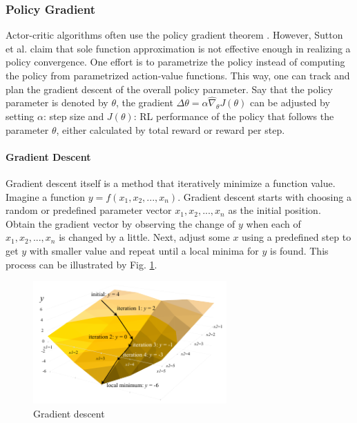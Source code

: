 \subsubsection{Policy Gradient}
Actor-critic algorithms often use the policy gradient theorem \cite{RL07}. However, Sutton et al. \cite{RL27} claim that sole function approximation is not effective enough in realizing a policy convergence. One effort is to parametrize the policy instead of computing the policy from parametrized action-value functions. This way, one can track and plan the gradient descent of the overall policy parameter. Say that the policy parameter is denoted by $\theta$, the gradient $\Delta\theta = \alpha\hat{\nabla}_\theta{}J(\theta)$ can be adjusted by setting $\alpha$: step size and $J(\theta)$: RL performance of the policy that follows the parameter $\theta$, either calculated by total reward or reward per step.

\paragraph{Gradient Descent}
Gradient descent itself is a method that iteratively minimize a function value. Imagine a function $y = f(x_1, x_2, ..., x_n)$. Gradient descent starts with choosing a random or predefined parameter vector $x_1, x_2, ..., x_n$ as the initial position. Obtain the gradient vector by observing the change of $y$ when each of $x_1, x_2, ..., x_n$ is changed by a little. Next, adjust some $x$ using a predefined step to get $y$ with smaller value and repeat until a local minima for $y$ is found. This process can be illustrated by Fig. \ref{fig:3gdes}.

\begin{figure}[h]
    \centering
    \includegraphics[width=0.66\textwidth]{graphics/3gdes.pdf}
    \caption{Gradient descent}
    \label{fig:3gdes}
\end{figure}

